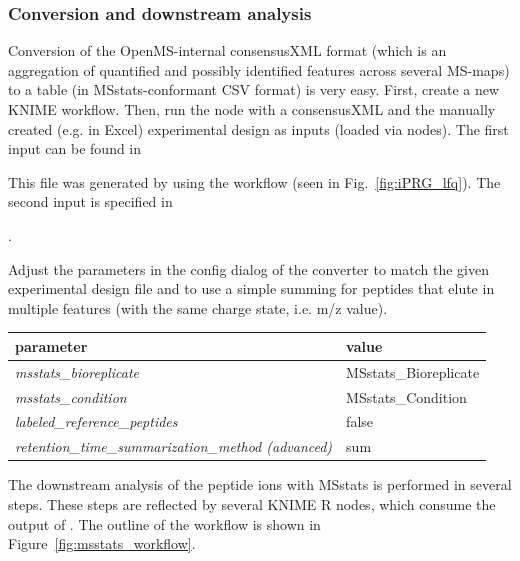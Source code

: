 \subsubsection{Conversion and downstream analysis}
\label{sec:MSstatsConversion}

Conversion of the OpenMS-internal consensusXML format (which is an aggregation of quantified and possibly identified features across several MS-maps) to a table (in MSstats-conformant CSV format) is very easy. First, create a new KNIME workflow. Then, run the  node with a consensusXML and the manually created (e.g. in Excel) experimental design as inputs (loaded via  nodes). The first input can be found in
\begin{center}
\end{center}
 This file was generated by using the  workflow (seen in Fig.~\ref{fig:iPRG_lfq}).  The second input is specified in
 \begin{center}
 .	
 \end{center}
Adjust the parameters in the config dialog of the converter to match the given experimental design file and to use a simple summing for peptides that elute in multiple features (with the same charge state, i.e. m/z value).

\begin{center}
	\begin{tabular}{ll}
		\toprule
		\textbf{parameter} & \textbf{value} \\ 
		\midrule
		\textit{msstats\_bioreplicate} & MSstats\_Bioreplicate \\
		\textit{msstats\_condition} & MSstats\_Condition \\
		\textit{labeled\_reference\_peptides} & false \\
		\textit{retention\_time\_summarization\_method (advanced)} & sum\\
		\bottomrule
	\end{tabular}
\end{center}

\noindent The downstream analysis of the peptide ions with MSstats is performed in several
steps. These steps are reflected by several KNIME R nodes, which consume
the output of . The outline of the workflow is shown in Figure~\ref{fig:msstats_workflow}.

